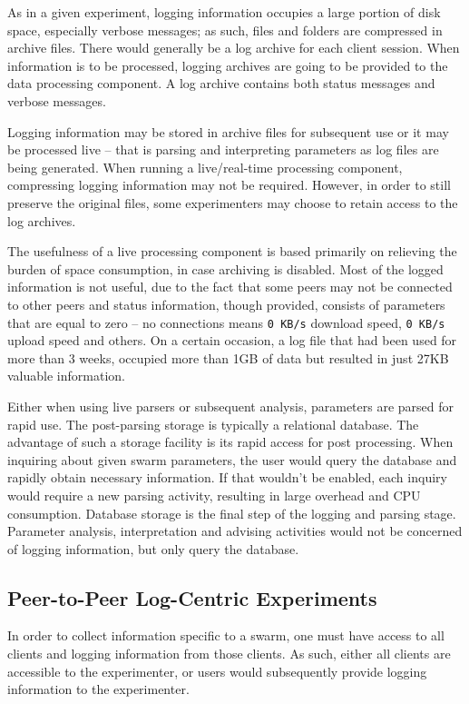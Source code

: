 As in a given experiment, logging information occupies a large portion of
disk space, especially verbose messages; as such, files and folders are compressed in
archive files. There would generally be a log archive for each client session.
When information is to be processed, logging archives are going to be provided
to the data processing component. A log archive contains both status messages
and verbose messages.

Logging information may be stored in archive files for subsequent use or it
may be processed live -- that is parsing and interpreting parameters as log
files are being generated. When running a live/real-time processing component,
compressing logging information may not be required. However, in order to
still preserve the original files, some experimenters may choose to retain
access to the log archives.

The usefulness of a live processing component is based primarily on
relieving the burden of space consumption, in case archiving is disabled. Most
of the logged information is not useful, due to the fact that some peers may
not be connected to other peers and status information, though provided,
consists of parameters that are equal to zero -- no connections means
\texttt{0 KB/s} download speed, \texttt{0 KB/s} upload speed and others. On a
certain occasion, a log file that had been used for more than 3 weeks,
occupied more than 1GB of data but resulted in just 27KB valuable
information.

Either when using live parsers or subsequent analysis, parameters are parsed
for rapid use. The post-parsing storage is typically a relational database.
The advantage of such a storage facility is its rapid access for
post processing. When inquiring about given swarm parameters, the user would
query the database and rapidly obtain necessary information. If that wouldn't
be enabled, each inquiry would require a new parsing activity, resulting in
large overhead and CPU consumption. Database storage is the final step of the
logging and parsing stage. Parameter analysis, interpretation and advising
activities would not be concerned of logging information, but only query the
database.

\subsection{Peer-to-Peer Log-Centric Experiments}

In order to collect information specific to a swarm, one must have access to
all clients and logging information from those clients. As such, either all
clients are accessible to the experimenter, or users would subsequently
provide logging information to the experimenter.

